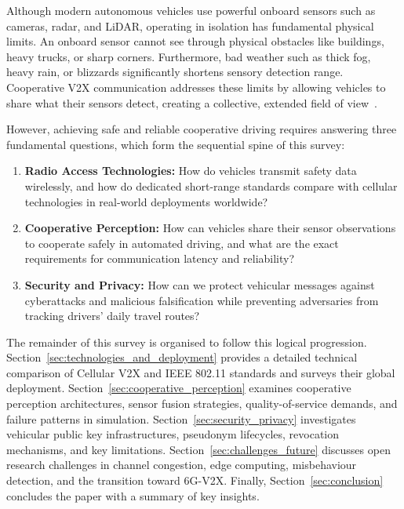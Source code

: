 Although modern autonomous vehicles use powerful onboard sensors such as cameras, radar, and LiDAR, operating in isolation has fundamental physical limits.
An onboard sensor cannot see through physical obstacles like buildings, heavy trucks, or sharp corners.
Furthermore, bad weather such as thick fog, heavy rain, or blizzards significantly shortens sensory detection range.
Cooperative V2X communication addresses these limits by allowing vehicles to share what their sensors detect, creating a collective, extended field of view~\cite{huang2025v2x}.

However, achieving safe and reliable cooperative driving requires answering three fundamental questions, which form the sequential spine of this survey:
\begin{enumerate}
    \item \textbf{Radio Access Technologies:} How do vehicles transmit safety data wirelessly, and how do dedicated short-range standards compare with cellular technologies in real-world deployments worldwide?
    \item \textbf{Cooperative Perception:} How can vehicles share their sensor observations to cooperate safely in automated driving, and what are the exact requirements for communication latency and reliability?
    \item \textbf{Security and Privacy:} How can we protect vehicular messages against cyberattacks and malicious falsification while preventing adversaries from tracking drivers' daily travel routes?
\end{enumerate}

The remainder of this survey is organised to follow this logical progression.
Section~\ref{sec:technologies_and_deployment} provides a detailed technical comparison of Cellular V2X and IEEE 802.11 standards and surveys their global deployment.
Section~\ref{sec:cooperative_perception} examines cooperative perception architectures, sensor fusion strategies, quality-of-service demands, and failure patterns in simulation.
Section~\ref{sec:security_privacy} investigates vehicular public key infrastructures, pseudonym lifecycles, revocation mechanisms, and key limitations.
Section~\ref{sec:challenges_future} discusses open research challenges in channel congestion, edge computing, misbehaviour detection, and the transition toward 6G-V2X.
Finally, Section~\ref{sec:conclusion} concludes the paper with a summary of key insights.
